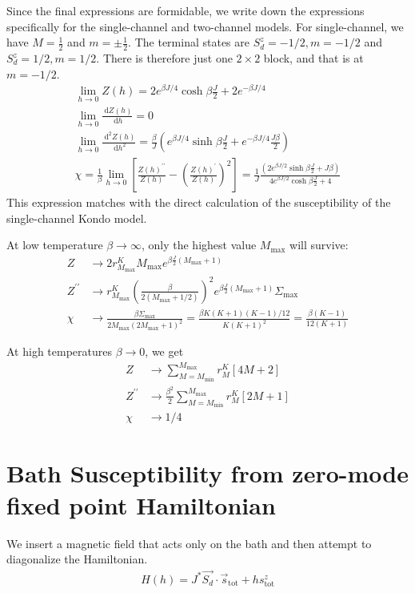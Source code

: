 \documentclass[12pt]{revtex4-2}
\begin{document}
Since the final expressions are formidable, we write down the expressions specifically for the single-channel and two-channel models. For single-channel, we have \(M=\frac{1}{2}\) and \(m = \pm \frac{1}{2}\). The terminal states are \(S_d^z=-1/2, m=-1/2\) and \(S_d^z=1/2, m=1/2\). There is therefore just one \(2\times 2\) block, and that is at \(m=-1/2\).
\begin{gather}
	\lim_{h \to 0}Z(h) = 2e^{\beta J/4}\cosh \beta \frac{J}{2} + 2e^{-\beta J/4} \\
	\lim_{h \to 0}\frac{\:\mathrm{d}Z(h)}{\:\mathrm{d}h} = 0 \\
	\lim_{h \to 0}\frac{\:\mathrm{d}^2Z(h)}{\:\mathrm{d}h^2} = \frac{\beta}{J}\left(e^{\beta J/4}\sinh \beta\frac{J}{2} + e^{-\beta J/4}\frac{J \beta}{2}\right)\\
	\chi = \frac{1}{\beta}\lim_{h \to 0}\left[\frac{Z(h)^{\prime\prime}}{Z(h)} - \left(\frac{Z(h)^{\prime}}{Z(h)}\right)^2 \right] = \frac{1}{J}\frac{\left(2e^{\beta J/2}\sinh \beta\frac{J}{2} + J \beta\right)}{4e^{\beta J/2}\cosh \beta \frac{J}{2} + 4}
\end{gather}
This expression matches with the direct calculation of the susceptibility of the single-channel Kondo model.

At low temperature \(\beta \to \infty\), only the highest value \(M_\text{max}\) will survive:
\begin{align}
	Z &\to 2 r^K_{M_\text{max}} M_\text{max} e^{\beta \frac{J}{2}(M_\text{max} + 1)}\\
	Z^{\prime \prime} &\to r^K_{M_\text{max}}\left(\frac{\beta }{2(M_\text{max} + 1/2)}\right)^2 e^{\beta \frac{J}{2}(M_\text{max} + 1)}\Sigma_\text{max}\\
	\chi &\to \frac{\beta\Sigma_\text{max}}{2M_\text{max}\left(2M_\text{max}+1\right)^2} = \frac{\beta K(K+1)(K-1)/12}{K(K+1)^2} = \frac{\beta(K-1)}{12(K+1)}
\end{align}

At high temperatures \(\beta \to 0\), we get
\begin{align}
	Z &\to \sum_{M=M_\text{min}}^{M_\text{max}}r^K_M\left[4M + 2\right]\\
	Z^{\prime \prime} &\to \frac{\beta^2}{2}\sum_{M=M_\text{min}}^{M_\text{max}}r^K_M\left[2M + 1\right]\\
	\chi &\to 1/4
\end{align}

\section{Bath Susceptibility from zero-mode fixed point Hamiltonian}
We insert a magnetic field that acts only on the bath and then attempt to diagonalize the Hamiltonian.
\begin{align}
	H(h) = J^* \vec{S_d}\cdot\vec{s}_\text{tot} + h s^z_\text{tot}
\end{align}
\end{document}
